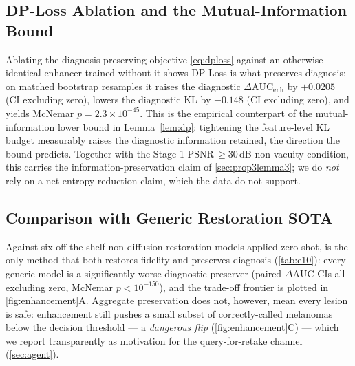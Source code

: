 \subsection{DP-Loss Ablation and the Mutual-Information Bound}\label{sec:exp-dploss}
Ablating the diagnosis-preserving objective \eqref{eq:dploss} against an otherwise
identical enhancer trained without it shows DP-Loss is what preserves diagnosis: on
matched bootstrap resamples it raises the diagnostic $\Delta\mathrm{AUC}_{\text{enh}}$
by $+0.0205$ (CI excluding zero), lowers the diagnostic KL by $-0.148$ (CI excluding
zero), and yields McNemar $p=2.3\times10^{-45}$. This is the empirical counterpart of
the mutual-information lower bound in Lemma~\ref{lem:dp}: tightening the feature-level
KL budget measurably raises the diagnostic information retained, the direction the bound
predicts. Together with the Stage-1 PSNR$\,\geq30$\,dB non-vacuity condition, this
carries the information-preservation claim of \cref{sec:prop3lemma3}; we do \emph{not}
rely on a net entropy-reduction claim, which the data do not support.

\subsection{Comparison with Generic Restoration SOTA}\label{sec:exp-sota}
Against six off-the-shelf non-diffusion restoration models applied zero-shot,
\visienhance{} is the only method that both restores fidelity and preserves diagnosis
(\cref{tab:e10}): every generic model is a significantly worse diagnostic preserver
(paired $\Delta\mathrm{AUC}$ CIs all excluding zero, McNemar $p<10^{-150}$), and the
trade-off frontier is plotted in \cref{fig:enhancement}A. Aggregate preservation does
not, however, mean every lesion is safe: enhancement still pushes a small subset of
correctly-called melanomas below the decision threshold --- a \emph{dangerous flip}
(\cref{fig:enhancement}C) --- which we report transparently as motivation for the
query-for-retake channel (\cref{sec:agent}).


